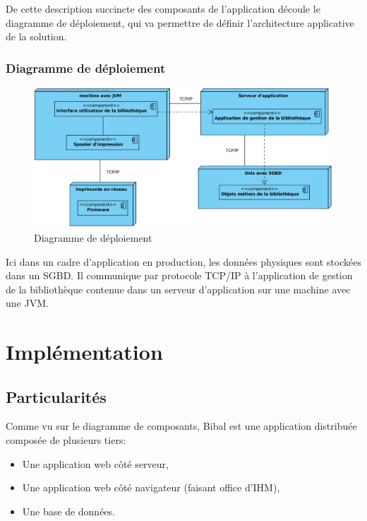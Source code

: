 \documentclass[a4paper,12pt]{article}
\begin{document}
De cette description succincte des composants de l’application découle le
diagramme de déploiement, qui va permettre de définir l’architecture
applicative de la solution.


\subsubsection{Diagramme de déploiement}
\label{sec:orgheadline14}

\begin{figure}[htb]
\centering
\includegraphics[width=.9\linewidth]{./res/img/diagramme-de-deploiement.png}
\caption{\label{fig:orgparagraph7}
Diagramme de déploiement}
\end{figure}

Ici dans un cadre d’application en production, les données physiques sont
stockées dans un SGBD. Il communique par protocole TCP/IP à l’application de
gestion de la bibliothèque contenue dans un serveur d’application sur une
machine avec une JVM.

\section{Implémentation}
\label{sec:orgheadline20}
\subsection{Particularités}
\label{sec:orgheadline17}

Comme vu sur le diagramme de composants, Bibal est une application distribuée composée de plusieurs tiers:
\begin{itemize}
\item Une application web côté serveur,
\item Une application web côté navigateur (faisant office d'IHM),
\item Une base de données.
\end{itemize}
\end{document}
